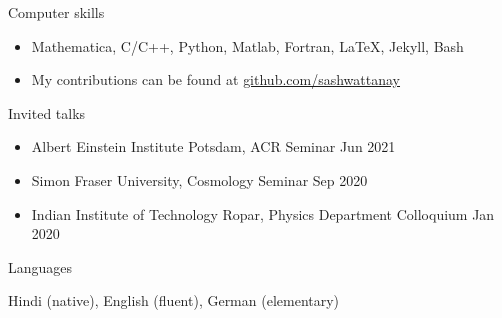 \documentclass{resume} %
\begin{document}
  
  \pagebreak
 
   

\begin{rSection}{Computer skills}


\begin{itemize}
\item Mathematica, C/C++, Python, Matlab, Fortran, LaTeX, Jekyll, Bash
\item My contributions can be found at  \href{https://github.com/sashwattanay}{github.com/sashwattanay} 
\end{itemize}


\end{rSection}
  



\begin{rSection}{Invited talks}


\begin{itemize}
\item Albert Einstein Institute Potsdam, ACR Seminar \hfill Jun 2021
\item Simon Fraser University, Cosmology Seminar \hfill Sep 2020
\item Indian Institute of Technology Ropar, Physics Department Colloquium \hfill Jan 2020
\end{itemize}


\end{rSection}






\begin{rSection}{Languages}


Hindi (native), English (fluent), German (elementary)


\end{rSection}



\end{document}
